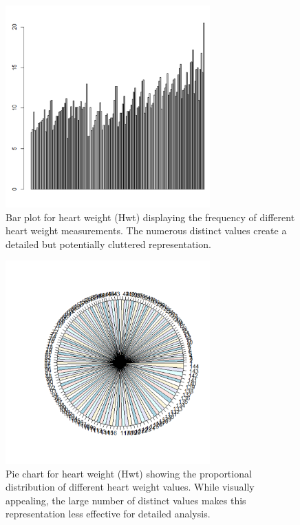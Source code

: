 \documentclass[a4paper,12pt]{article}
\begin{document}
\begin{figure}[H]
    \centering
    \includegraphics[width=0.7\textwidth]{barplothwt.png}
    \caption{Bar plot for heart weight (Hwt) displaying the frequency of different heart weight measurements. The numerous distinct values create a detailed but potentially cluttered representation.}
    \label{fig:barplothwt}
\end{figure}

\begin{figure}[H]
    \centering
    \includegraphics[width=0.7\textwidth]{oiehwt.png}
    \caption{Pie chart for heart weight (Hwt) showing the proportional distribution of different heart weight values. While visually appealing, the large number of distinct values makes this representation less effective for detailed analysis.}
    \label{fig:oiehwt}
\end{figure}
\end{document}

